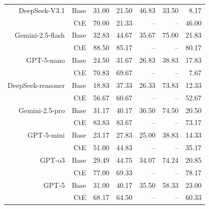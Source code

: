 \begin{table}[!t]
\begin{tabular}{r r !{\color{white!80!black} \vline} r r r r r}
\sf DeepSeek-V3.1  & Base & 31.00 & 21.50 & 46.83 & 33.50 & 8.17 \\
& CtE & 70.00 & 21.33 & -- & -- & 46.00 \\ \midrule
\sf Gemini-2.5-flash  & Base & 32.83 & 44.67 & 35.67 & 75.00 & 21.83 \\
& CtE & 88.50 & 85.17 & -- & -- & 80.17 \\ \midrule
\sf GPT-5-nano  & Base & 24.50 & 31.67 & 26.83 & 38.83 & 17.83 \\
& CtE & 70.83 & 69.67 & -- & -- & 7.67 \\ \midrule
\sf DeepSeek-reasoner  & Base & 18.83 & 37.33 & 26.33 & 73.83 & 12.33 \\
& CtE & 56.67 & 60.67 & -- & -- & 52.67 \\ \midrule
\sf Gemini-2.5-pro  & Base & 31.17 & 40.17 & 36.50 & 74.50 & 20.50 \\
& CtE & 83.83 & 83.67 & -- & -- & 73.17 \\ \midrule
\sf GPT-5-mini  & Base & 23.17 & 27.83 & 25.00 & 38.83 & 14.33 \\
& CtE & 51.00 & 44.83 & -- & -- & 35.17 \\ \midrule
\sf GPT-o3  & Base & 29.49 & 44.75 & 34.07 & 74.24 & 20.85 \\
& CtE & 77.00 & 69.33 & -- & -- & 78.17 \\ \midrule
\sf GPT-5  & Base & 31.00 & 40.17 & 35.50 & 58.33 & 23.00 \\
& CtE & 68.17 & 64.50 & -- & -- & 60.33 \\ 
\bottomrule
\end{tabular}
\label{tab:cRi_by_id_act}
\end{table}
